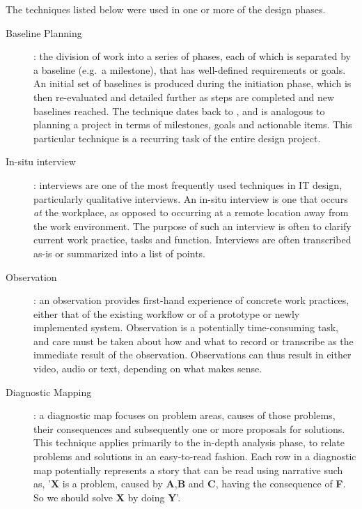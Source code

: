 The techniques listed below were used in one or more of the design phases.
\begin{description}
    \item [Baseline Planning]: the division of work into a series of phases,
        each of which is separated by a baseline (e.g.\ a milestone), that has well-defined
        requirements or goals. An initial set of baselines is produced during the initiation
        phase, which is then re-evaluated and detailed further as steps are completed and new
        baselines reached. The technique dates back to \cite{andersen1990professional}, and is
        analogous to planning a project in terms of milestones, goals and actionable items. This
        particular technique is a recurring task of the entire design project.

    \item [In-situ interview]: interviews are one of the most frequently used techniques in IT 
        design, particularly qualitative interviews\cite{bodker2004participatory}. An in-situ
        interview is one that occurs \textit{at} the workplace, as opposed to occurring at a
        remote location away from the work environment. The purpose of such an interview is often
        to clarify current work practice, tasks and function. Interviews are often transcribed as-is
        or summarized into a list of points.

    \item [Observation]: an observation provides first-hand experience of concrete work practices,
        either that of the existing workflow or of a prototype or newly implemented system. Observation
        is a potentially time-consuming task, and care must be taken about how and what to record or transcribe
        as the immediate result of the observation. Observations can thus result in either video, audio or text,
        depending on what makes sense.

    \item [Diagnostic Mapping]: a diagnostic map focuses on problem areas, causes of those problems, their consequences
        and subsequently one or more proposals for solutions. This technique applies primarily to the in-depth analysis phase,
        to relate problems and solutions in an easy-to-read fashion. Each row in a diagnostic map potentially represents a story 
        that can be read using narrative such as, '\textbf{X} is a problem, caused by \textbf{A},\textbf{B} and \textbf{C}, having 
        the consequence of \textbf{F}. So we should solve \textbf{X} by doing \textbf{Y}'. 


\end{description}
